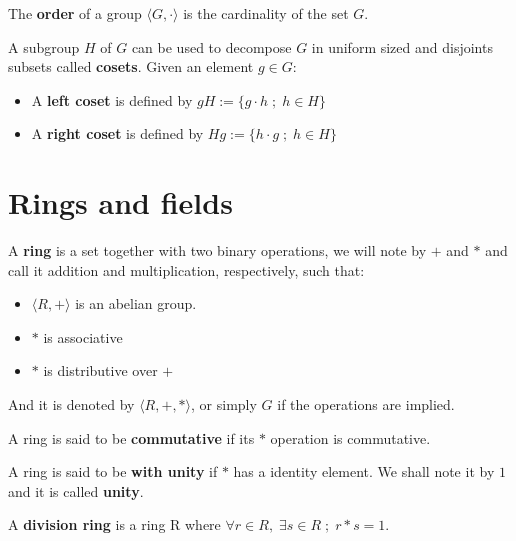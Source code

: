 \documentclass[Ingles]{ic-tese-v3}
\begin{document}
\begin{definition}
  The \textbf{order} of a group $\langle G,\cdot\rangle$ is the cardinality of the set $G$.
\end{definition}

\begin{definition}
  A subgroup $H$ of $G$ can be used to decompose $G$ in uniform sized and
  disjoints subsets called \textbf{cosets}. Given an element $g \in G$:
  \begin{itemize}
  \item A \textbf{left coset} is defined by $gH := \{g\cdot h \; ; \; h \in H\}$
  \item A \textbf{right coset} is defined by $Hg := \{h\cdot g \; ; \; h \in H\}$
  \end{itemize}
\end{definition}

\section{Rings and fields}
\label{sec:org4a9f867}

   \begin{definition}
  A \textbf{ring} is a set together with two binary operations, we will note by
  $+$ and $*$ and call it addition and multiplication, respectively, such that:
  \begin{itemize}
  \item $\langle R,+\rangle$ is an abelian group.
  \item $*$ is associative
  \item $*$ is distributive over $+$
  \end{itemize}

  And it is denoted by $\langle R,+,*\rangle$, or simply $G$ if the operations are implied.
\end{definition}

\begin{definition}
  A ring is said to be \textbf{commutative} if its $*$ operation is commutative.
\end{definition}

\begin{definition}
  A ring is said to be \textbf{with unity} if $*$ has a identity element. We
  shall note it by $1$ and it is called \textbf{unity}.

\end{definition}

\begin{definition}
  A \textbf{division ring} is a ring R where $\forall r \in R, \; \exists s \in R \; ; \; r*s = 1$.
\end{definition}
\end{document}
